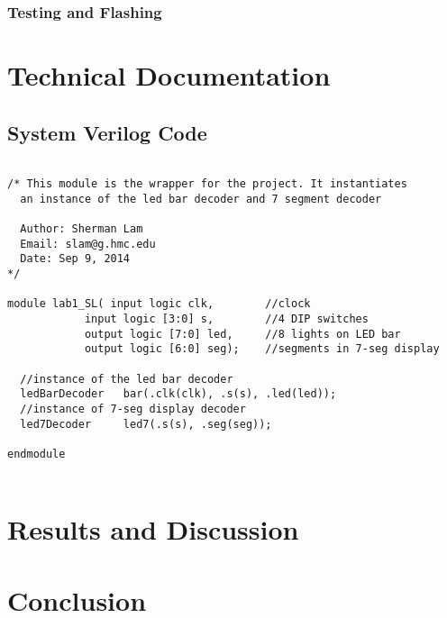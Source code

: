 \documentclass[11pt]{article}
\begin{document}
\subsubsection{Testing and Flashing}



\section{Technical Documentation}



\subsection{System Verilog Code}

\small\begin{verbatim}

/* This module is the wrapper for the project. It instantiates
  an instance of the led bar decoder and 7 segment decoder
  
  Author: Sherman Lam
  Email: slam@g.hmc.edu
  Date: Sep 9, 2014
*/

module lab1_SL( input logic clk,        //clock
            input logic [3:0] s,        //4 DIP switches
            output logic [7:0] led,     //8 lights on LED bar
            output logic [6:0] seg);    //segments in 7-seg display
  
  //instance of the led bar decoder
  ledBarDecoder   bar(.clk(clk), .s(s), .led(led));   
  //instance of 7-seg display decoder
  led7Decoder     led7(.s(s), .seg(seg)); 

endmodule


\end{verbatim}




\clearpage

\section{Results and Discussion}




\section{Conclusion}
\end{document}
